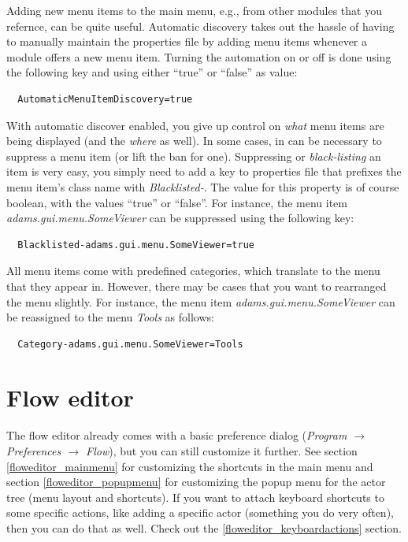 Adding new menu items to the main menu, e.g., from other modules that you
refernce, can be quite useful. Automatic discovery takes out the hassle of
having to manually maintain the properties file by adding menu items whenever
a module offers a new menu item. Turning the automation on or off is done using
the following key and using either ``true'' or ``false'' as value:
\begin{verbatim}
  AutomaticMenuItemDiscovery=true
\end{verbatim}

With automatic discover enabled, you give up control on \textit{what} menu
items are being displayed (and the \textit{where} as well). In some cases,
in can be necessary to suppress a menu item (or lift the ban for one).
Suppressing or \textit{black-listing} an item is very easy, you simply need
to add a key to properties file that prefixes the menu item's class name
with \textit{Blacklisted-}. The value for this property is of course boolean,
with the values ``true'' or ``false''. For instance, the menu item
\textit{adams.gui.menu.SomeViewer} can be suppressed using the following key:
\begin{verbatim}
  Blacklisted-adams.gui.menu.SomeViewer=true
\end{verbatim}

All menu items come with predefined categories, which translate to the menu
that they appear in. However, there may be cases that you want to rearranged
the menu slightly. For instance, the menu item
\textit{adams.gui.menu.SomeViewer} can be reassigned to the menu \textit{Tools}
as follows:
\begin{verbatim}
  Category-adams.gui.menu.SomeViewer=Tools
\end{verbatim}

\section{Flow editor}
The flow editor already comes with a basic preference dialog (\textit{Program
$\rightarrow$ Preferences $\rightarrow$ Flow}), but you can still customize it further.
See section \ref{floweditor_mainmenu} for customizing the shortcuts in the
main menu and section \ref{floweditor_popupmenu} for customizing the popup
menu for the actor tree (menu layout and shortcuts). If you want to attach
keyboard shortcuts to some specific actions, like adding a specific actor
(something you do very often), then you can do that as well. Check out the
\ref{floweditor_keyboardactions} section.

